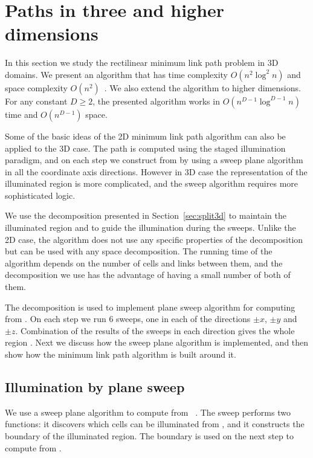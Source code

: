 \documentclass[english,gradu]{tktltiki2018}
\begin{document}
\section{Paths in three and higher dimensions}\label{sec:minlink3d}

In this section we study the rectilinear minimum link path problem in 3D domains.
We present an algorithm that has time complexity $O(n^2\log^2 n)$ and space complexity $O(n^2)$~\cite{restricted}.
We also extend the algorithm to higher dimensions.
For any constant $D\ge 2$, the presented algorithm works in $O(n^{D-1}\log^{D-1}n)$ time and $O(n^{D-1})$ space.

Some of the basic ideas of the 2D minimum link path algorithm can also be applied to the 3D case.
The path is computed using the staged illumination paradigm, and on each step we construct  from  by using a sweep plane algorithm in all the coordinate axis directions.
However in 3D case the representation of the illuminated region is more complicated, and the sweep algorithm requires more sophisticated logic.

We use the decomposition presented in Section~\ref{sec:split3d} to maintain the illuminated region and to guide the illumination during the sweeps.
Unlike the 2D case, the algorithm does not use any specific properties of the decomposition but can be used with any space decomposition.
The running time of the algorithm depends on the number of cells and links between them, and the decomposition we use has the advantage of having a small number of both of them.

The decomposition is used to implement plane sweep algorithm for computing  from .
On each step we run 6 sweeps, one in each of the directions $\pm x$, $\pm y$ and $\pm z$.
Combination of the results of the sweeps in each direction gives the whole region .
Next we discuss how the sweep plane algorithm is implemented, and then show how the minimum link path algorithm is built around it.

\subsection{Illumination by plane sweep}

We use a sweep plane algorithm to compute  from ~\cite{restricted}.
The sweep performs two functions: it discovers which cells can be illuminated from , and it constructs the boundary of the illuminated region.
The boundary is used on the next step to compute  from .
\end{document}
